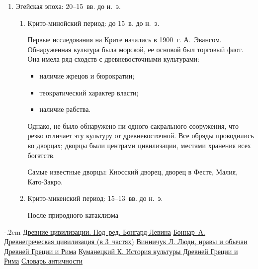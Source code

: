   \begin{enumerate}
    \item Эгейская эпоха: 20--15~вв. до н.~э.
      \begin{enumerate}
        \item Крито-минойский период: до 15~в. до н.~э.
        
          Первые исследования на Крите начались в 1900~г. А.~Эвансом.
          Обнаруженная культура была морской, ее основой был торговый флот. Она
          имела ряд сходств с древневосточными культурами:
          \begin{itemize}
            \item наличие жрецов и бюрократии;
            \item теократический характер власти;
            \item наличие рабства.
          \end{itemize}
          Однако, не было обнаружено ни одного сакрального сооружения, что резко
          отличает эту культуру от древневосточной. Все обряды проводились во
          дворцах; дворцы были центрами цивилизации, местами хранения всех
          богатств.
          
          Самые известные дворцы: Кносский дворец, дворец в Фесте, Малия,
          Като-Закро.

        \item Крито-микенский период: 15--13~вв. до н.~э.
        
          После природного катаклизма
      \end{enumerate}
  \end{enumerate}

  \begin{thebibliography}{9}
    \itemsep -.2em
     \href{http://padabum.com/x.php?id=9471}{Древние цивилизации.
      Под~ред. Бонгард-Левина}
     \href{http://dwl.alleng.ru/d_ar/hist_vm/hist009_1.zip}{Боннар~А.
      Древнегреческая цивилизация (в 3~частях)}
     \href{http://rghost.ru/download/48161358/%
      1c27882309bef2be09ca96fbc9283bea85743dcd/hist_vm040.zip}{Винничук Л. Люди,
      нравы и обычаи Древней Греции и Рима}
     \href{http://vk.cc/2j6Z3y}{Куманецкий К. История культуры
      Древней Греции и Рима}
     \href{http://rghost.ru/download/48076731/%
      a45295d3ba73f1541079ebf3b1f35a3f9b3e8574/cult013.zip}{Словарь античности}
  \end{thebibliography}
